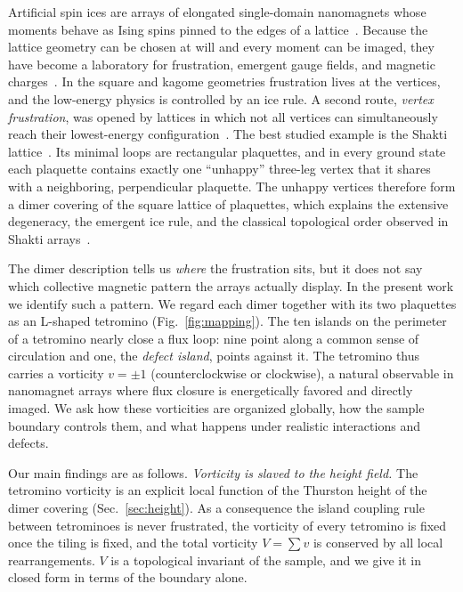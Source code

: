 \documentclass[aps,prb,twocolumn,floatfix,longbibliography]{revtex4-2}
\begin{document}
Artificial spin ices are arrays of elongated single-domain nanomagnets whose moments behave as Ising spins pinned to the edges of a lattice~\cite{Wang2006,Nisoli2013RMP,Skjaervo2020,Sultana2025}. Because the lattice geometry can be chosen at will and every moment can be imaged, they have become a laboratory for frustration, emergent gauge fields, and magnetic charges~\cite{Moller2006,Castelnovo2008,Henley2010,Perrin2016,Farhan2013}. In the square and kagome geometries frustration lives at the vertices, and the low-energy physics is controlled by an ice rule. A second route, \emph{vertex frustration}, was opened by lattices in which not all vertices can simultaneously reach their lowest-energy configuration~\cite{Morrison2013,Nisoli2022,Crater2024}. The best studied example is the Shakti lattice~\cite{Chern2013,Gilbert2014,Lao2018}. Its minimal loops are rectangular plaquettes, and in every ground state each plaquette contains exactly one ``unhappy'' three-leg vertex that it shares with a neighboring, perpendicular plaquette. The unhappy vertices therefore form a dimer covering of the square lattice of plaquettes, which explains the extensive degeneracy, the emergent ice rule, and the classical topological order observed in Shakti arrays~\cite{Chern2013,Gilbert2014,Lao2018}.

The dimer description tells us \emph{where} the frustration sits, but it does not say which collective magnetic pattern the arrays actually display. In the present work we identify such a pattern. We regard each dimer together with its two plaquettes as an L-shaped tetromino (Fig.~\ref{fig:mapping}). The ten islands on the perimeter of a tetromino nearly close a flux loop: nine point along a common sense of circulation and one, the \emph{defect island}, points against it. The tetromino thus carries a vorticity $v=\pm1$ (counterclockwise or clockwise), a natural observable in nanomagnet arrays where flux closure is energetically favored and directly imaged. We ask how these vorticities are organized globally, how the sample boundary controls them, and what happens under realistic interactions and defects.

Our main findings are as follows. \emph{Vorticity is slaved to the height field.} The tetromino vorticity is an explicit local function of the Thurston height of the dimer covering (Sec.~\ref{sec:height}). As a consequence the island coupling rule between tetrominoes is never frustrated, the vorticity of every tetromino is fixed once the tiling is fixed, and the total vorticity $V=\sum v$ is conserved by all local rearrangements. $V$ is a topological invariant of the sample, and we give it in closed form in terms of the boundary alone.
\end{document}
